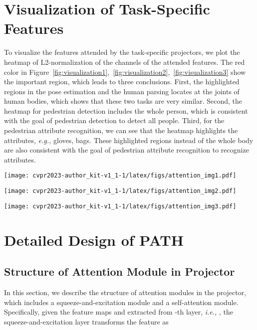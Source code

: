 \documentclass[10pt,twocolumn,letterpaper]{article}
\begin{document}
\section{Visualization of Task-Specific Features}
To visualize the features attended by the task-specific projectors, we plot the heatmap of L2-normalization of the channels of the attended features. The red color in Figure~\ref{fig:visualization1},~\ref{fig:visualization2},~\ref{fig:visualization3} show the important region, which leads to three conclusions. First, the highlighted regions in the pose estimation and the human parsing locates at the joints of human bodies, which shows that these two tasks are very similar. Second, the heatmap for pedestrian detection includes the whole person, which is consistent with the goal of pedestrian detection to detect all people. Third, for the pedestrian attribute recognition, we can see that the heatmap highlights the attributes, \emph{e.g.,} gloves, bags. These highlighted regions instead of the whole body are also consistent with the goal of pedestrian attribute recognition to recognize attributes.



\begin{figure*}
    \centering
    \texttt{[image: cvpr2023-author\_kit-v1\_1-1/latex/figs/attention\_img1.pdf]}
    \caption{Visualization of features after the task-specific projectors}
    \label{fig:visualization1}
\end{figure*}

\begin{figure*}
    \centering
    \texttt{[image: cvpr2023-author\_kit-v1\_1-1/latex/figs/attention\_img2.pdf]}
    \caption{Visualization of features after the task-specific projectors}
    \label{fig:visualization2}
\end{figure*}

\begin{figure*}
    \centering
    \texttt{[image: cvpr2023-author\_kit-v1\_1-1/latex/figs/attention\_img3.pdf]}
    \caption{Visualization of features after the task-specific projectors}
    \label{fig:visualization3}
\end{figure*}


\section{Detailed Design of PATH}

\subsection{Structure of Attention Module in Projector}
In this section, we describe the structure of attention modules in the projector, which includes a squeeze-and-excitation module and a self-attention module. Specifically, given the feature maps  and  extracted from -th layer, \emph{i.e.,} , the squeeze-and-excitation layer  transforms the feature  as 
\end{document}
